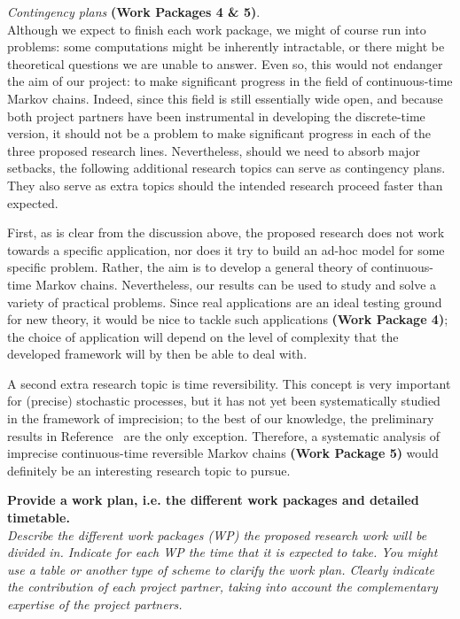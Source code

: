 \documentclass[11pt,dvipsnames,usenames,a4paper]{article}
\begin{document}
\emph{Contingency plans} {\bf (Work Packages 4 \& 5)}.\\[3pt]
Although we expect to finish each work package, we might of course run into problems: some computations might be inherently intractable, or there might be theoretical questions we are unable to answer.
Even so, this would not endanger the aim of our project: to make significant progress in the field of continuous-time Markov chains.
Indeed, since this field is still essentially wide open, and because both project partners have been instrumental in developing the discrete-time version, it should not be a problem to make significant progress in each of the three proposed research lines.
Nevertheless, should we need to absorb major setbacks, the following additional research topics can serve as contingency plans.
They also serve as extra topics should the intended research proceed faster than expected.

First, as is clear from the discussion above, the proposed research does not work towards a specific application, nor does it try to build an ad-hoc model for some specific problem.
Rather, the aim is to develop a general theory of continuous-time Markov chains.
Nevertheless, our results can be used to study and solve a variety of practical problems.
Since real applications are an ideal testing ground for new theory, it would be nice to tackle such applications {\bf (Work Package 4)}; the choice of application will depend on the level of complexity that the developed framework will by then be able to deal with.

A second extra research topic is time reversibility.
This concept is very important for (precise) stochastic processes, but it has not yet been systematically studied in the framework of imprecision; to the best of our knowledge, the preliminary results in Reference~\cite{skulj2016} are the only exception.
Therefore, a systematic analysis of imprecise continuous-time reversible Markov chains {\bf (Work Package 5)} would definitely be an interesting research topic to pursue.


\vspace{7pt}

\textbf{Provide a work plan, i.e. the different work packages and detailed timetable.}\\
\textit{Describe the different work packages (WP) the proposed research work will be divided in.
Indicate for each WP the time that it is expected to take.
You might use a table or another type of scheme to clarify the work plan. Clearly indicate the contribution of each project partner, taking into account the complementary expertise of the project partners.}
\end{document}
